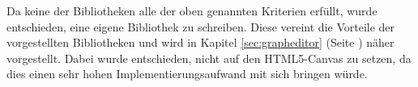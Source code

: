 Da keine der Bibliotheken alle der oben genannten Kriterien erfüllt, wurde entschieden, eine eigene Bibliothek zu schreiben. Diese vereint die Vorteile der vorgestellten Bibliotheken und wird in Kapitel \ref{sec:grapheditor} (Seite \pageref{sec:grapheditor}) näher vorgestellt. Dabei wurde entschieden, nicht auf den HTML5-Canvas zu setzen, da dies einen sehr hohen Implementierungsaufwand mit sich bringen würde.